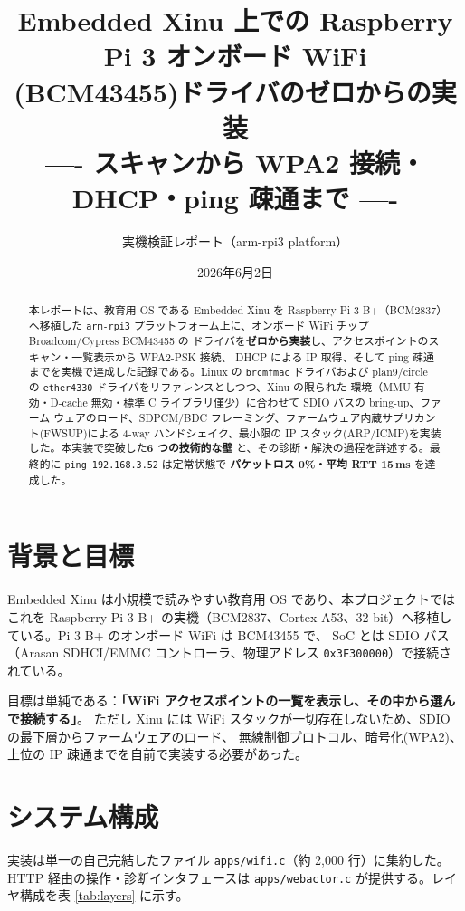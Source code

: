 \documentclass[a4paper,11pt]{ltjsarticle}
\title{\textbf{Embedded Xinu 上での Raspberry Pi 3 オンボード WiFi\\(BCM43455)ドライバのゼロからの実装}\\[4pt]
\large ---- スキャンから WPA2 接続・DHCP・ping 疎通まで ----}
\author{実機検証レポート（arm-rpi3 platform）}
\date{2026年6月2日}
\begin{document}
\maketitle

\begin{abstract}
本レポートは、教育用 OS である Embedded Xinu を Raspberry Pi 3 B+（BCM2837）へ移植した
\texttt{arm-rpi3} プラットフォーム上に、オンボード WiFi チップ Broadcom/Cypress BCM43455 の
ドライバを\textbf{ゼロから実装}し、アクセスポイントのスキャン・一覧表示から WPA2-PSK 接続、
DHCP による IP 取得、そして ping 疎通までを実機で達成した記録である。Linux の \texttt{brcmfmac}
ドライバおよび plan9/circle の \texttt{ether4330} ドライバをリファレンスとしつつ、Xinu の限られた
環境（MMU 有効・D-cache 無効・標準 C ライブラリ僅少）に合わせて SDIO バスの bring-up、ファーム
ウェアのロード、SDPCM/BDC フレーミング、ファームウェア内蔵サプリカント(FWSUP)による 4-way
ハンドシェイク、最小限の IP スタック(ARP/ICMP)を実装した。本実装で突破した\textbf{6 つの技術的な壁}
と、その診断・解決の過程を詳述する。最終的に \texttt{ping 192.168.3.52} は定常状態で
\textbf{パケットロス 0\%・平均 RTT 15\,ms} を達成した。
\end{abstract}

\section{背景と目標}
Embedded Xinu は小規模で読みやすい教育用 OS であり、本プロジェクトではこれを Raspberry Pi 3 B+
の実機（BCM2837、Cortex-A53、32-bit）へ移植している。Pi 3 B+ のオンボード WiFi は BCM43455 で、
SoC とは SDIO バス（Arasan SDHCI/EMMC コントローラ、物理アドレス \texttt{0x3F300000}）で接続されている。

目標は単純である：\textbf{「WiFi アクセスポイントの一覧を表示し、その中から選んで接続する」}。
ただし Xinu には WiFi スタックが一切存在しないため、SDIO の最下層からファームウェアのロード、
無線制御プロトコル、暗号化(WPA2)、上位の IP 疎通までを自前で実装する必要があった。

\section{システム構成}
実装は単一の自己完結したファイル \texttt{apps/wifi.c}（約 2{,}000 行）に集約した。
HTTP 経由の操作・診断インタフェースは \texttt{apps/webactor.c} が提供する。レイヤ構成を表
\ref{tab:layers} に示す。
\end{document}
